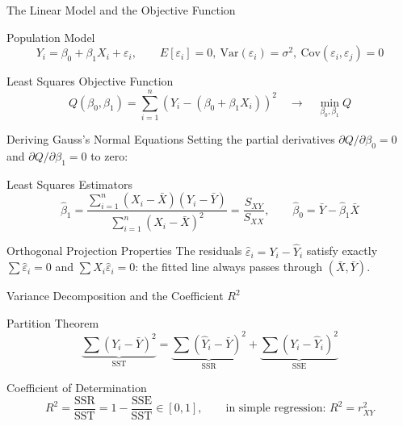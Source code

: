 \documentclass[10pt, aspectratio=169]{beamer}
\begin{document}
\begin{frame}{The Linear Model and the Objective Function}
  \footnotesize
  \begin{block}{Population Model}
    $$Y_i=\beta_0+\beta_1 X_i+\varepsilon_i, \qquad E[\varepsilon_i]=0,\ \text{Var}(\varepsilon_i)=\sigma^2,\ \text{Cov}(\varepsilon_i,\varepsilon_j)=0$$
  \end{block}
  \pause

  \vspace{0.1cm}
  \begin{alertblock}{Least Squares Objective Function}
    $$Q(\beta_0,\beta_1)=\sum_{i=1}^n\left(Y_i-(\beta_0+\beta_1 X_i)\right)^2 \quad \longrightarrow \quad \min_{\beta_0,\beta_1} Q$$
  \end{alertblock}
\end{frame}

\begin{frame}{Deriving Gauss's Normal Equations}
  \footnotesize
  Setting the partial derivatives $\partial Q/\partial\beta_0=0$ and $\partial Q/\partial\beta_1=0$ to zero: \pause

  \vspace{0.1cm}
  \begin{block}{Least Squares Estimators}
    $$\hat\beta_1=\frac{\sum_{i=1}^n(X_i-\bar X)(Y_i-\bar Y)}{\sum_{i=1}^n(X_i-\bar X)^2}=\frac{S_{XY}}{S_{XX}}, \qquad \hat\beta_0=\bar Y-\hat\beta_1\bar X$$
  \end{block}
  \pause

  \vspace{0.05cm}
  \begin{alertblock}{Orthogonal Projection Properties}
    The residuals $\hat\varepsilon_i=Y_i-\hat Y_i$ satisfy exactly $\sum\hat\varepsilon_i=0$ and $\sum X_i\hat\varepsilon_i=0$: the fitted line always passes through $(\bar X,\bar Y)$.
  \end{alertblock}
\end{frame}

\begin{frame}{Variance Decomposition and the Coefficient $R^2$}
  \footnotesize
  \begin{block}{Partition Theorem}
    $$\underbrace{\sum(Y_i-\bar Y)^2}_{\text{SST}} = \underbrace{\sum(\hat Y_i-\bar Y)^2}_{\text{SSR}} + \underbrace{\sum(Y_i-\hat Y_i)^2}_{\text{SSE}}$$
  \end{block}
  \pause

  \vspace{0.1cm}
  \begin{alertblock}{Coefficient of Determination}
    $$R^2=\frac{\text{SSR}}{\text{SST}}=1-\frac{\text{SSE}}{\text{SST}} \in[0,1], \qquad \text{in simple regression: } R^2=r_{XY}^2$$
  \end{alertblock}
\end{frame}
\end{document}
